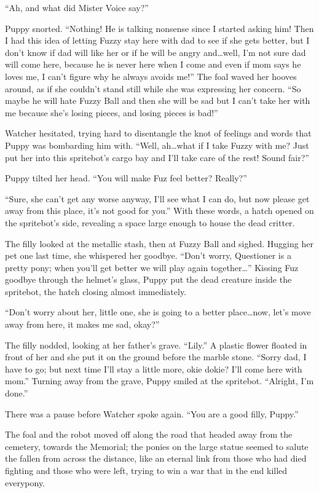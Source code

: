 ``Ah, and what did Mister Voice say?''

Puppy snorted. ``Nothing! He is talking nonsense since I started asking him! Then I had this idea of letting Fuzzy stay here with dad to see if she gets better, but I don't know if dad will like her or if he will be angry and\dots well, I'm not sure dad will come here, because he is never here when I come and even if mom says he loves me, I can't figure why he always avoids me!'' The foal waved her hooves around, as if she couldn't stand still while she was expressing her concern. ``So maybe he will hate Fuzzy Ball and then she will be sad but I can't take her with me because she's losing pieces, and losing pieces is bad!''

Watcher hesitated, trying hard to disentangle the knot of feelings and words that Puppy was bombarding him with. ``Well, ah\dots what if I take Fuzzy with me? Just put her into this spritebot's cargo bay and I'll take care of the rest! Sound fair?''

Puppy tilted her head. ``You will make Fuz feel better? Really?''

``Sure, she can't get any worse anyway, I'll see what I can do, but now please get away from this place, it's not good for you.'' With these words, a hatch opened on the spritebot's side, revealing a space large enough to house the dead critter.

The filly looked at the metallic stash, then at Fuzzy Ball and sighed. Hugging her pet one last time, she whispered her goodbye. ``Don't worry, Questioner is a pretty pony; when you'll get better we will play again together\dots'' Kissing Fuz goodbye through the helmet's glass, Puppy put the dead creature inside the spritebot, the hatch closing almost immediately.

``Don't worry about her, little one, she is going to a better place\dots now, let's move away from here, it makes me sad, okay?''

The filly nodded, looking at her father's grave. ``Lily.'' A plastic flower floated in front of her and she put it on the ground before the marble stone. ``Sorry dad, I have to go; but next time I'll stay a little more, okie dokie? I'll come here with mom.'' Turning away from the grave, Puppy smiled at the spritebot. ``Alright, I'm done.''

There was a pause before Watcher spoke again. ``You are a good filly, Puppy.''

The foal and the robot moved off along the road that headed away from the cemetery, towards the Memorial; the ponies on the large statue seemed to salute the fallen from across the distance, like an eternal link from those who had died fighting and those who were left, trying to win a war that in the end killed everypony.

